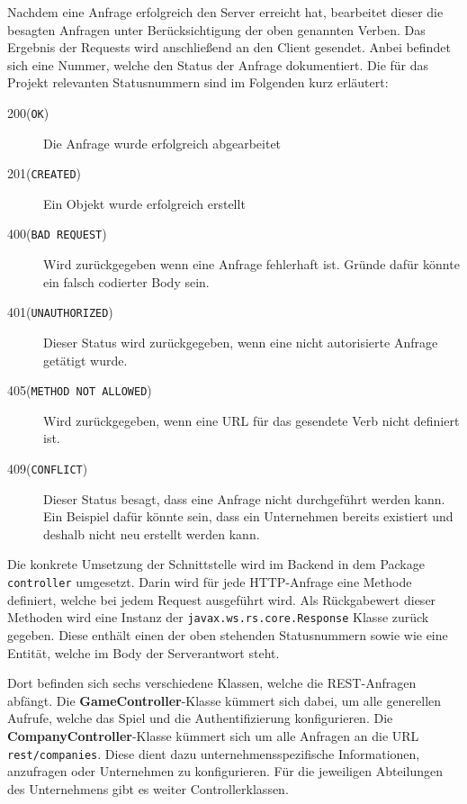Nachdem eine Anfrage erfolgreich den Server erreicht hat, bearbeitet dieser die besagten Anfragen unter Berücksichtigung der oben genannten Verben. Das Ergebnis der Requests wird anschließend an den Client gesendet. Anbei befindet sich eine Nummer, welche den Status der Anfrage dokumentiert. Die für das Projekt relevanten Statusnummern sind im Folgenden kurz erläutert:


\begin{description}
	\item[200(\texttt{OK})] Die Anfrage wurde erfolgreich abgearbeitet
	\item[201(\texttt{CREATED})] Ein Objekt wurde erfolgreich erstellt
	
	\item[400(\texttt{BAD REQUEST})] Wird zurückgegeben wenn eine Anfrage fehlerhaft ist. Gründe dafür könnte ein falsch codierter Body sein.
	\item[401(\texttt{UNAUTHORIZED})] Dieser Status wird zurückgegeben, wenn eine nicht autorisierte Anfrage getätigt wurde.
	\item[405(\texttt{METHOD NOT ALLOWED})] Wird zurückgegeben, wenn eine URL für das gesendete Verb nicht definiert ist.
	\item[409(\texttt{CONFLICT})] Dieser Status besagt, dass eine Anfrage nicht durchgeführt werden kann. Ein Beispiel dafür könnte sein, dass ein Unternehmen bereits existiert und deshalb nicht neu erstellt werden kann.
\end{description}

Die konkrete Umsetzung der Schnittstelle wird im Backend in dem Package \texttt{controller} umgesetzt. 
Darin wird für jede \ac{HTTP}-Anfrage eine Methode definiert, welche bei jedem Request ausgeführt wird.
Als Rückgabewert dieser Methoden wird eine Instanz der \texttt{javax.ws.rs.core.Response} Klasse zurück gegeben.
Diese enthält einen der oben stehenden Statusnummern sowie wie eine Entität, welche im Body der Serverantwort steht.


Dort befinden sich sechs verschiedene Klassen, welche die \ac{REST}-Anfragen abfängt. Die \textbf{GameController}-Klasse kümmert sich dabei, um alle generellen Aufrufe, welche das Spiel und die Authentifizierung konfigurieren.
Die \textbf{CompanyController}-Klasse kümmert sich um alle Anfragen an die URL \texttt{rest/companies}. Diese dient dazu unternehmensspezifische Informationen, anzufragen oder Unternehmen zu konfigurieren. Für die jeweiligen Abteilungen des Unternehmens gibt es weiter Controllerklassen. 


